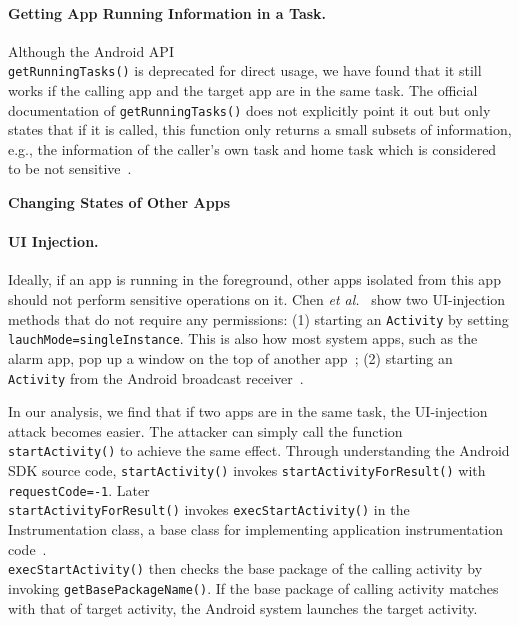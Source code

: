 \documentclass[letterpaper,12pt]{article}
\begin{document}
\paragraph*{Getting App Running Information in a Task.}
Although the Android API \\
\texttt{getRunningTasks()} is deprecated for
direct usage, we have found that it still works if the calling app and
the target app are in the same task.  The official documentation of
\texttt{getRunningTasks()} does not explicitly point it out but only
states that if it is called, this function only returns a small
subsets of information, e.g., the information of the caller's own task
and home task which is considered to be not
sensitive~\cite{getrunningtask}.


\textbf{Changing States of Other Apps}

\noindent

\paragraph*{UI Injection.}
Ideally, if an app is running in the foreground, other apps isolated
from this app should not perform sensitive operations on it. Chen {\em et
al.}~\cite{UIstateinference} show two UI-injection methods that do not
require any permissions: (1) starting an \texttt{Activity} by setting
\texttt{lauchMode=singleInstance}. This is also how most system apps,
such as the alarm app, pop up a window on the top of another
app~\cite{androidlaunchmode}; (2) starting an \texttt{Activity} from
the Android broadcast receiver~\cite{androidbroadcastreceiver}.

In our analysis, we find that if two apps are in the same task, the
UI-injection attack becomes easier.  The attacker can simply call the
function \texttt{startActivity()} to achieve the same effect. Through
understanding the Android SDK source code, \texttt{startActivity()}
invokes \texttt{startActivityForResult()} with
\texttt{requestCode=-1}. Later \\
\texttt{startActivityForResult()}
invokes \texttt{execStartActivity()} in the Instrumentation class, a
base class for implementing application instrumentation
code~\cite{Instrumentation}. \\
 \texttt{execStartActivity()} then checks
the base package of the calling activity by invoking
\texttt{getBasePackageName()}. If the base package of calling activity
matches with that of target activity, the Android system launches the
target activity.
\end{document}
